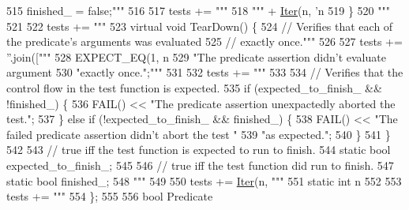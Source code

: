\begin{DoxyCode}
{{{{{{{{{{{{{{{{{{{{{{{{{{{{{{{{{{{{{{515 \textcolor{stringliteral}{    finished\_ = false;"""} %
516 
517   tests += \textcolor{stringliteral}{"""}
518 \textcolor{stringliteral}{    """} + \hyperlink{namespacegen__gtest__pred__impl_ac016218b7c9437d1d5ac85c574c83069}{Iter}(n, \textcolor{stringliteral}{'n%
519 \textcolor{stringliteral}{  \}}
520 \textcolor{stringliteral}{"""}
521 
522   tests += \textcolor{stringliteral}{"""}
523 \textcolor{stringliteral}{  virtual void TearDown() \{}
524 \textcolor{stringliteral}{    // Verifies that each of the predicate's arguments was evaluated}
525 \textcolor{stringliteral}{    // exactly once."""}
526 
527   tests += \textcolor{stringliteral}{''}.join([\textcolor{stringliteral}{"""}
528 \textcolor{stringliteral}{    EXPECT\_EQ(1, n%
529 \textcolor{stringliteral}{        "The predicate assertion didn't evaluate argument %
530 \textcolor{stringliteral}{        "exactly once.";"""} %
531 
532   tests += \textcolor{stringliteral}{"""}
533 \textcolor{stringliteral}{}
534 \textcolor{stringliteral}{    // Verifies that the control flow in the test function is expected.}
535 \textcolor{stringliteral}{    if (expected\_to\_finish\_ && !finished\_) \{}
536 \textcolor{stringliteral}{      FAIL() << "The predicate assertion unexpactedly aborted the test.";}
537 \textcolor{stringliteral}{    \} else if (!expected\_to\_finish\_ && finished\_) \{}
538 \textcolor{stringliteral}{      FAIL() << "The failed predicate assertion didn't abort the test "}
539 \textcolor{stringliteral}{                "as expected.";}
540 \textcolor{stringliteral}{    \}}
541 \textcolor{stringliteral}{  \}}
542 \textcolor{stringliteral}{}
543 \textcolor{stringliteral}{  // true iff the test function is expected to run to finish.}
544 \textcolor{stringliteral}{  static bool expected\_to\_finish\_;}
545 \textcolor{stringliteral}{}
546 \textcolor{stringliteral}{  // true iff the test function did run to finish.}
547 \textcolor{stringliteral}{  static bool finished\_;}
548 \textcolor{stringliteral}{"""} %
549 
550   tests += \hyperlink{namespacegen__gtest__pred__impl_ac016218b7c9437d1d5ac85c574c83069}{Iter}(n, \textcolor{stringliteral}{"""}
551 \textcolor{stringliteral}{  static int n%
552 
553   tests += \textcolor{stringliteral}{"""}
554 \textcolor{stringliteral}{\};}
555 \textcolor{stringliteral}{}
556 \textcolor{stringliteral}{bool Predicate%
}}}}}}}}}}}}}}}}}}}}}}}}}}}}}}}}}}}}}}}}}}}
\end{DoxyCode}
